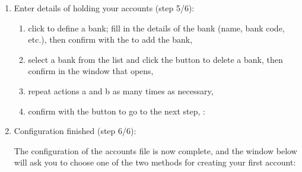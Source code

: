 \begin{enumerate}
\begin{figure}[htbp]
	\begin{center}
		\texttt{[image: image/screenshot/start\_category\_select]}
	\end{center}
	\caption{Selection of categories to be used}%
	\label{start_category_select}
\end{figure}

		\begin{enumerate} 
			\item click on your desired category, either the  or the \footnote{ Users installing the program on a system with a French Language interface will find different categories are offered including some for business users} 
			\item check the  box to check if other categories are available\footnote{ This option is mainly for the benefit of users of a computer system with the French Language interface who will then be shown the two English categories mentioned in the previous step}
			\item confirm with the  button;
		\end{enumerate}
	\item Enter details of  holding your accounts (step 5/6):
		\begin{enumerate} 
 			\item click  to define a bank; fill in the details of the bank (name, bank code, etc.), then confirm with the  to add the bank,
			\item select a bank from the list and click the  button to delete a bank, then confirm in the window that opens,
			\item repeat actions a and b as many times as necessary,
			\item  confirm with the   button to go to the next step, :
		\end{enumerate} 

	\item Configuration finished (step 6/6):\par

	The configuration of the accounts file is now complete, and the window below will ask you to choose one of the two methods for creating your first account:


\end{enumerate}
